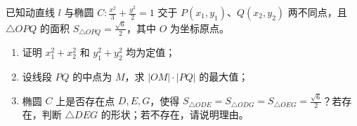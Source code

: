 \begin{example}
已知动直线 \(l\) 与椭圆 \(C: \frac{x^2}{3} + \frac{y^2}{2} = 1\) 交于 \(P(x_1,y_1)\)、\(Q(x_2,y_2)\) 两不同点，且 \(\triangle OPQ\) 的面积 \(S_{\triangle OPQ} = \frac{\sqrt{6}}{2}\)，其中 \(O\) 为坐标原点。
\begin{enumerate}
    \item 证明 \(x_1^2 + x_2^2\) 和 \(y_1^2 + y_2^2\) 均为定值；
    \item 设线段 \(PQ\) 的中点为 \(M\)，求 \(|OM| \cdot |PQ|\) 的最大值；
    \item 椭圆 \(C\) 上是否存在点 \(D,E,G\)，使得 \(S_{\triangle ODE} = S_{\triangle ODG} = S_{\triangle OEG} = \frac{\sqrt{6}}{2}\)？若存在，判断 \(\triangle DEG\) 的形状；若不存在，请说明理由。
\end{enumerate}
\end{example}
